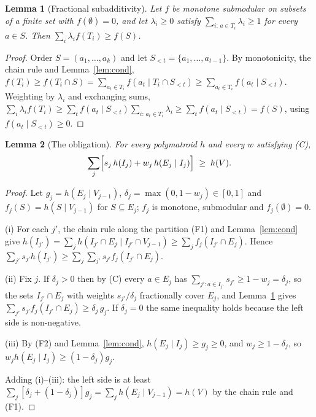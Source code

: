\documentclass[11pt]{article}
\newcommand{\interface}{I}
\newtheorem{lemma}{Lemma}
\begin{document}
\begin{lemma}[Fractional subadditivity]\label{lem:frac}
Let $f$ be monotone submodular on subsets of a finite set with
$f(\emptyset)=0$, and let $\lambda_i\ge0$ satisfy
$\sum_{i:\,a\in T_i}\lambda_i\ge1$ for every $a\in S$. Then
$\sum_i\lambda_if(T_i)\ge f(S)$.
\end{lemma}
\begin{proof}
Order $S=(a_1,\dots,a_k)$ and let $S_{<t}=\{a_1,\dots,a_{t-1}\}$. By
monotonicity, the chain rule and Lemma~\ref{lem:cond},
$f(T_i)\ge f(T_i\cap S)=\sum_{a_t\in T_i}f(a_t\mid T_i\cap S_{<t})
\ge\sum_{a_t\in T_i}f(a_t\mid S_{<t})$. Weighting by $\lambda_i$ and
exchanging sums, $\sum_i\lambda_if(T_i)\ge\sum_t f(a_t\mid S_{<t})
\sum_{i:\,a_t\in T_i}\lambda_i\ge\sum_t f(a_t\mid S_{<t})=f(S)$, using
$f(a_t\mid S_{<t})\ge0$.
\end{proof}

\begin{lemma}[The obligation]\label{lem:obl}
For every polymatroid $h$ and every $w$ satisfying (C),
\[
\sum_j\Bigl[s_j\,h(\interface_j)+w_j\,h(E_j\mid\interface_j)\Bigr]\;\ge\;h(V).
\]
\end{lemma}
\begin{proof}
Let $g_j=h(E_j\mid V_{j-1})$, $\delta_j=\max(0,1-w_j)\in[0,1]$ and
$f_j(S)=h(S\mid V_{j-1})$ for $S\subseteq E_j$; $f_j$ is monotone,
submodular and $f_j(\emptyset)=0$.

(i) For each $j'$, the chain rule along the partition (F1) and
Lemma~\ref{lem:cond} give
$h(\interface_{j'})=\sum_j h(\interface_{j'}\cap E_j\mid
\interface_{j'}\cap V_{j-1})\ge\sum_j f_j(\interface_{j'}\cap E_j)$.
Hence $\sum_{j'}s_{j'}h(\interface_{j'})\ge\sum_j\sum_{j'}s_{j'}
f_j(\interface_{j'}\cap E_j)$.

(ii) Fix $j$. If $\delta_j>0$ then by (C) every $a\in E_j$ has
$\sum_{j':a\in\interface_{j'}}s_{j'}\ge1-w_j=\delta_j$, so the sets
$\interface_{j'}\cap E_j$ with weights $s_{j'}/\delta_j$ fractionally
cover $E_j$, and Lemma~\ref{lem:frac} gives
$\sum_{j'}s_{j'}f_j(\interface_{j'}\cap E_j)\ge\delta_j\,g_j$. If
$\delta_j=0$ the same inequality holds because the left side is
non-negative.

(iii) By (F2) and Lemma~\ref{lem:cond}, $h(E_j\mid\interface_j)\ge g_j\ge0$,
and $w_j\ge1-\delta_j$, so $w_jh(E_j\mid\interface_j)\ge(1-\delta_j)g_j$.

Adding (i)--(iii): the left side is at least
$\sum_j[\delta_j+(1-\delta_j)]g_j=\sum_jh(E_j\mid V_{j-1})=h(V)$ by the
chain rule and (F1).
\end{proof}
\end{document}

